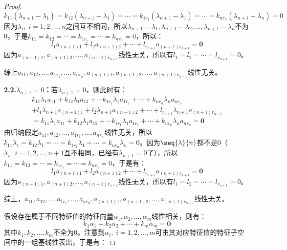 \begin{proof}
\begin{equation*}
		k_{11}(\lambda_{n+1}-\lambda_1)=k_{12}(\lambda_{n+1}-\lambda_1)=\cdots=k_{1r_1}(\lambda_{n+1}-\lambda_1)=\cdots=k_{nr_n}(\lambda_{n+1}-\lambda_n)=0
	\end{equation*}
	因为$\lambda_i,\;i=1,2,\dots,n$之间互不相同，所以$\lambda_{n+1}-\lambda_1,\lambda_{n+1}-\lambda_2,\dots,\lambda_{n+1}-\lambda_n$不为$0$，于是$k_{11}=k_{12}=\cdots=k_{1r_1}=\cdots=k_{nr_n}=0$，所以：
	\begin{equation*}
		l_1a_{(n+1)1}+l_2a_{(n+1)2}+\cdots+l_{r_{n+1}}a_{(n+1)r_{n+1}}=\mathbf{0}
	\end{equation*}
	因为$a_{(n+1)1},a_{(n+1)2},\dots,a_{(n+1)r_{n+1}}$线性无关，所以有$l_1=l_2=\cdots=l_{r_{n+1}}=0$。\par
	综上$a_{11},a_{12},\dots,a_{1r_1},\dots,a_{nr_n},a_{(n+1)1},a_{(n+1)2},\dots,a_{(n+1)r_{n+1}}$线性无关。\par
	\textbf{2.2.$\lambda_{n+1}=0$：}若$\lambda_{n+1}=0$，则此时有：
	\begin{gather*}
		k_{11}\lambda_1a_{11}+k_{12}\lambda_1a_{12}+\cdots k_{1r_1}\lambda_1a_{1r_1}+\cdots+k_{nr_n}\lambda_na_{nr_n} \\
		+l_1\lambda_{n+1}a_{(n+1)1}+l_2\lambda_{n+1}a_{(n+1)2}+\cdots+l_{r_{n+1}}\lambda_{n+1}a_{(n+1)r_{n+1}} \\
		=k_{11}\lambda_1a_{11}+k_{12}\lambda_1a_{12}+\cdots k_{1r_1}\lambda_1a_{1r_1}+\cdots+k_{nr_n}\lambda_na_{nr_n}=\mathbf{0}
	\end{gather*}
	由归纳假定$a_{11},a_{12},\dots,a_{1r_1},\dots,a_{nr_n}$线性无关，所以$k_{11}\lambda_1=k_{12}\lambda_1=\cdots=k_{1r_1}\lambda_1=\cdots=k_{nr_n}\lambda_n=0$。因为$\seq{\lambda}{n}$都不是$0$（$\lambda_i,\;i=1,2,\dots,n+1$互不相同，已经有$\lambda_{n+1}=0$了），所以$k_{11}=k_{12}=\cdots=k_{1r_1}=\cdots=k_{nr_n}=0$，于是有：
	\begin{equation*}
		l_1a_{(n+1)1}+l_2a_{(n+1)2}+\cdots+l_{r_{n+1}}a_{(n+1)r_{n+1}}=\mathbf{0}
	\end{equation*}
	因为$a_{(n+1)1},a_{(n+1)2},\dots,a_{(n+1)r_{n+1}}$线性无关，所以有$l_1=l_2=\cdots=l_{r_{n+1}}=0$。\par
	综上，$a_{11},a_{12},\dots,a_{1r_1},\dots,a_{nr_n},a_{(n+1)1},a_{(n+1)2},\dots,a_{(n+1)r_{n+1}}$线性无关。\par
	假设存在属于不同特征值的特征向量$\alpha_1,\alpha_2,\dots,\alpha_m$线性相关，则有：
	\begin{equation*}
		k_1\alpha_1+k_2\alpha_2+\cdots+k_m\alpha_m=\mathbf{0}
	\end{equation*}
	其中$k_1,k_2,\dots,k_m$不全为$0$。注意到$\alpha_i,\;i=1,2,\dots,m$可由其对应特征值的特征子空间中的一组基线性表出，于是有：

\end{proof}
